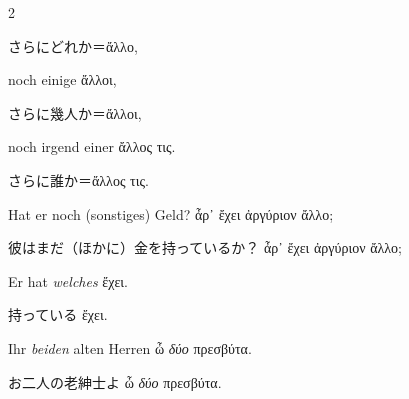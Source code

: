 \begin{paracol}{2}
\begin{enumerate}[leftmargin=0pt,rightmargin=0pt,listparindent =1cm,labelindent=1cm,labelsep=1ex,labelwidth={*},itemindent={*},align=left]
\begin{continuousitemline}
\begin{japanese}
さらにどれか＝\textgreek[variant=ancient]{ἄλλο,}
\end{japanese}
\switchcolumn*

\begin{german}
noch einige \textgreek[variant=ancient]{ἄλλοι,}
\end{german}
\switchcolumn

\begin{japanese}
さらに幾人か＝\textgreek[variant=ancient]{ἄλλοι,}
\end{japanese}
\switchcolumn*

\begin{german}
noch irgend einer \textgreek[variant=ancient]{ἄλλος τις.}
\end{german}
\switchcolumn

\begin{japanese}
さらに誰か＝\textgreek[variant=ancient]{ἄλλος τις.}
\end{japanese}
\switchcolumn*

\begin{german}
Hat er noch (sonstiges) Geld? \textgreek[variant=ancient]{ἆρ᾽ ἔχει
ἀργύριον ἄλλο;}
\end{german}
\switchcolumn

\begin{japanese}
彼はまだ（ほかに）金を持っているか？ \textgreek[variant=ancient]{ἆρ᾽ ἔχει
ἀργύριον ἄλλο;}
\end{japanese}
\switchcolumn*

\begin{german}
Er hat \emph{welches} \textgreek[variant=ancient]{ἔχει.}
\end{german}
\switchcolumn

\begin{japanese}
持っている \textgreek[variant=ancient]{ἔχει.}
\end{japanese}
\switchcolumn*
\end{continuousitemline}

\begin{german}
\item Ihr \emph{beiden} alten Herren \textgreek[variant=ancient]{ὦ \emph{δύο}
πρεσβύτα.}
\end{german}
\switchcolumn

\begin{japanese}
お二人の老紳士よ \textgreek[variant=ancient]{ὦ \emph{δύο} πρεσβύτα.}
\end{japanese}
\switchcolumn*


\end{enumerate}
\end{paracol}
